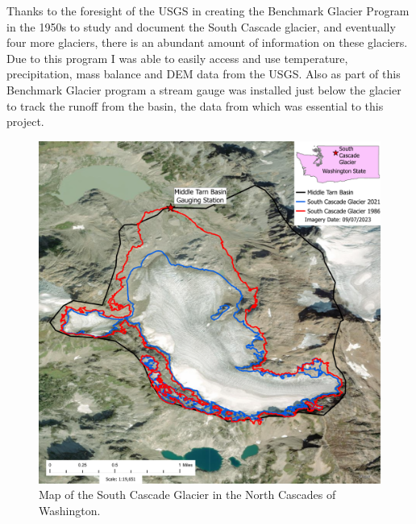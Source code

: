 \documentclass{article}
\begin{document}
Thanks to the foresight of the USGS in creating the Benchmark Glacier Program in the 1950s to study and document the South Cascade glacier, 
and eventually four more glaciers, there is an abundant amount of information on these glaciers. Due to this program I was able to 
easily access and use temperature, precipitation, mass balance and DEM data from the USGS. Also as part of this Benchmark Glacier program a 
stream gauge was installed just below the glacier to track the runoff from the basin, the data from which was essential to this project.

\begin{figure}[h!]
    \centering
    \includegraphics[width=\textwidth]{Plots/SouthCascadeGlacierMap.pdf}
    \caption{Map of the South Cascade Glacier in the North Cascades of Washington.}
    \label{fig:south_cascade_glacier}
\end{figure}
\FloatBarrier
\end{document}
